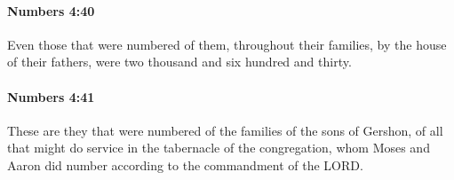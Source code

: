		\paragraph{Numbers 4:40} %
			\label{NUMBERS-4-40}

			Even those that were numbered of them, throughout their families, by the house of their fathers, were two thousand and six hundred and thirty.


		\paragraph{Numbers 4:41} %
			\label{NUMBERS-4-41}

			These are they that were numbered of the families of the sons of Gershon, of all that might do service in the tabernacle of the congregation, whom Moses and Aaron did number according to the commandment of the LORD.


